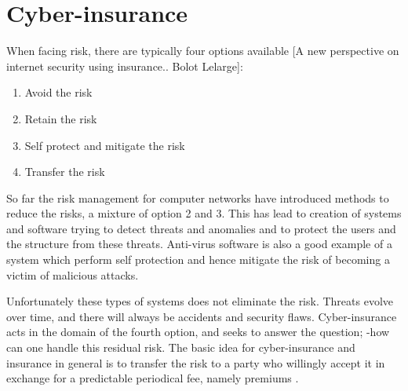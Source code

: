  \section{Cyber-insurance}
When facing risk, there are typically four options available [A new perspective on internet security using insurance.. Bolot Lelarge]:
\begin{enumerate}
\item Avoid the risk
\item Retain the risk
\item Self protect and mitigate the risk
\item Transfer the risk
\end{enumerate}
So far the risk management for computer networks have introduced methods to reduce the risks, 
a mixture of option 2 and 3. This has lead to creation of systems and software trying to detect threats and anomalies and to protect the users and the structure from these threats. Anti-virus software is also a good example of a system which perform self protection and hence mitigate the risk of becoming a victim of malicious attacks.

Unfortunately these types of systems does not eliminate the risk. Threats evolve over time, and there will always be accidents and security flaws. Cyber-insurance acts in the domain of the fourth option, and seeks to answer the question; -how can one handle this residual risk. The basic idea for cyber-insurance and insurance in general is to transfer the risk to a party who willingly accept it in exchange for a predictable periodical fee, namely premiums \cite{bolot2008cyber}. 
   
